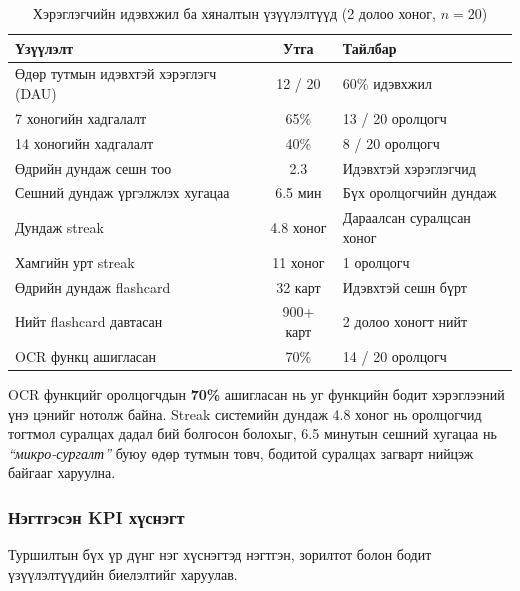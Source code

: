 \begin{table}[H]
\centering
\caption{Хэрэглэгчийн идэвхжил ба хяналтын үзүүлэлтүүд (2 долоо хоног, $n=20$)}
\label{tab:engagement}
\begin{tabular}{|l|c|l|}
\hline
\textbf{Үзүүлэлт} & \textbf{Утга} & \textbf{Тайлбар} \\
\hline
Өдөр тутмын идэвхтэй хэрэглэгч (DAU) & 12 / 20 & 60\% идэвхжил \\
\hline
7 хоногийн хадгалалт & 65\% & 13 / 20 оролцогч \\
\hline
14 хоногийн хадгалалт & 40\% & 8 / 20 оролцогч \\
\hline
Өдрийн дундаж сешн тоо & 2.3 & Идэвхтэй хэрэглэгчид \\
\hline
Сешний дундаж үргэлжлэх хугацаа & 6.5 мин & Бүх оролцогчийн дундаж \\
\hline
Дундаж streak & 4.8 хоног & Дараалсан суралцсан хоног \\
\hline
Хамгийн урт streak & 11 хоног & 1 оролцогч \\
\hline
Өдрийн дундаж flashcard & 32 карт & Идэвхтэй сешн бүрт \\
\hline
Нийт flashcard давтасан & 900+ карт & 2 долоо хоногт нийт \\
\hline
OCR функц ашигласан & 70\% & 14 / 20 оролцогч \\
\hline
\end{tabular}
\end{table}

OCR функцийг оролцогчдын \textbf{70\%} ашигласан нь уг функцийн бодит хэрэглээний үнэ цэнийг нотолж байна. Streak системийн дундаж 4.8 хоног нь оролцогчид тогтмол суралцах дадал бий болгосон болохыг, 6.5 минутын сешний хугацаа нь \textit{``микро-сургалт''} буюу өдөр тутмын товч, бодитой суралцах загварт нийцэж байгааг харуулна.



\subsubsection{Нэгтгэсэн KPI хүснэгт}
\label{subsubsec:kpi}

Туршилтын бүх үр дүнг нэг хүснэгтэд нэгтгэн, зорилтот болон бодит үзүүлэлтүүдийн биелэлтийг харуулав.

